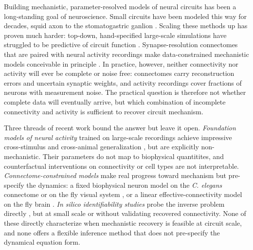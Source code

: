 \documentclass{article}
\makeatletter
\DeclareRobustCommand\citepos
  {\begingroup
   \let\NAT@nmfmt\NAT@posfmt%
   \NAT@swafalse\let\NAT@ctype\z@\NAT@partrue
   \@ifstar{\NAT@fulltrue\NAT@citetp}{\NAT@fullfalse\NAT@citetp}}
\let\NAT@orig@nmfmt\NAT@nmfmt
\def\NAT@posfmt#1{\NAT@orig@nmfmt{#1's}}
\makeatother
\begin{document}
Building mechanistic, parameter-resolved models of neural circuits has been a long-standing goal of neuroscience.
Small circuits have been modeled this way for decades, \citepos{hodgkin_quantitative_1952} squid axon to the stomatogastric ganlion \citep{marder_multiple_2011}.
Scaling these methods up has proven much harder: top-down, hand-specified large-scale simulations have struggled to be predictive of circuit function \citep{markram_reconstruction_2015,fregnac_neuroscience_2014}.
Synapse-resolution connectomes that are paired with neural activity recordings make data-constrained mechanistic models conceivable in principle \citep{the_microns_consortium_functional_2025}.
In practice, however, neither connectivity nor activity will ever be complete or noise free: connectomes carry reconstruction errors and uncertain synaptic weights, and activity recordings cover fractions of neurons with measurement noise.
The practical question is therefore not whether complete data will eventually arrive, but which combination of incomplete connectivity and activity is sufficient to recover circuit mechanism.

Three threads of recent work bound the answer but leave it open.  \emph{Foundation models of neural activity} trained on large-scale recordings achieve impressive cross-stimulus and cross-animal generalization \citep{wang_foundation_2025}, but are explicitly non-mechanistic.
Their parameters do not map to biophysical quantitites, and counterfactual interventions on connectivity or cell types are not interpretable.
\emph{Connectome-constrained models} make real progress toward mechanism but pre-specify the dynamics: a fixed biophysical neuron model on the \emph{C. elegans} connectome \citep{mi_connectome-constrained_2021} or on the fly visual system \citep{lappalainen_connectome-constrained_2024}, or a linear effective-connectivity model on the fly brain \cite{pospisil_fly_2024}.
\emph{In silico identifiability studies} probe the inverse problem directly \citep{yu_discovering_2025,lueckmann_discovering_2026}, but at small scale or without validating recovered connectivity.  None of these directly characterize when mechanistic recovery is feasible at circuit scale, and none offers a flexible inference method that does not pre-specify the dynamical equation form.
\end{document}
